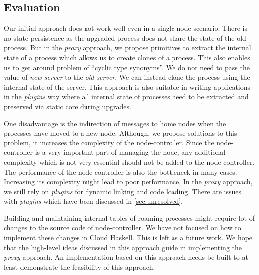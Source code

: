 \subsection{Evaluation}
\label{sec:proxyeval}

Our initial approach does not work well even in a single node
scenario. There is no state persistence as the upgraded process does
not share the state of the old process. But in the \emph{proxy}
approach, we propose primitives to extract the internal state of a
process which allows us to create clones of a process. This also
enables us to get around problem of ``cyclic type synonyms''. We do
not need to pass the value of \emph{new server} to the \emph{old
  server}. We can instead clone the process using the internal state
of the server. This approach is also suitable in writing applications
in the \emph{plugins} way where all internal state of processes need
to be extracted and preserved via static core during upgrades.

One disadvantage is the indirection of messages to home nodes when the
processes have moved to a new node. Although, we propose solutions to
this problem, it increases the complexity of the
node-controller. Since the node-controller is a very important part of
managing the node, any additional complexity which is not very
essential should not be added to the node-controller. The performance
of the node-controller is also the bottleneck in many
cases. Increasing its complexity might lead to poor performance. In
the \emph{proxy} approach, we still rely on \emph{plugins} for dynamic
linking and code loading. There are issues with \emph{plugins} which
have been discussed in \autoref{sec:unresolved}.

Building and maintaining internal tables of roaming processes might
require lot of changes to the source code of node-controller. We have
not focused on how to implement these changes in Cloud Haskell. This
is left as a future work. We hope that the high-level ideas discussed
in this approach guide in implementing the \emph{proxy} approach. An
implementation based on this approach needs be built to at least
demonstrate the feasibility of this approach.

